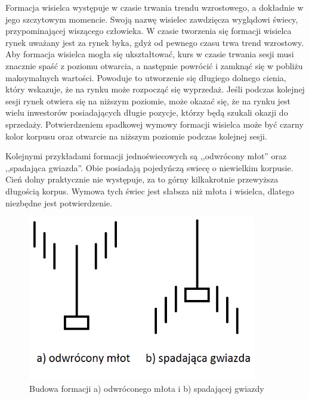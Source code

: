 \documentclass[pdflatex,11pt]{aghdpl}
\begin{document}
Formacja wisielca występuje w czasie trwania trendu wzrostowego, a dokładnie w jego szczytowym momencie. Swoją nazwę wisielec zawdzięcza wyglądowi świecy, przypominającej wiszącego człowieka. W czasie tworzenia się formacji wisielca rynek uważany jest za rynek byka, gdyż od pewnego czasu trwa trend wzrostowy. Aby formacja wisielca mogła się ukształtować, kurs w czasie trwania sesji musi znacznie spaść z poziomu otwarcia, a następnie powrócić i zamknąć się w pobliżu maksymalnych wartości. Powoduje to utworzenie się długiego dolnego cienia, który wskazuje, że na rynku może rozpocząć się wyprzedaż. Jeśli podczas kolejnej sesji rynek otwiera się na niższym poziomie, może okazać się, że na rynku jest wielu inwestorów posiadających długie pozycje, którzy będą szukali okazji do sprzedaży. Potwierdzeniem spadkowej wymowy formacji wisielca może być czarny kolor korpusu oraz otwarcie na niższym poziomie podczas kolejnej sesji.

Kolejnymi przykładami formacji jednoświecowych są ,,odwrócony młot'' oraz ,,spadająca gwiazda''. Obie posiadają pojedyńczą swiecę o niewielkim korpusie. Cień dolny praktycznie nie występuje, za to górny kilkakrotnie przewyższa długością korpus. Wymowa tych świec jest słabsza niż młota i wisielca, dlatego niezbędne jest potwierdzenie.  
\begin{figure}[ht]
\begin{center}
\includegraphics[width=10cm]{invert_hammer.png}
\caption{Budowa formacji a) odwróconego młota i b) spadającej gwiazdy}
\label{odwr_mlot}
\end{center}
\end{figure} 
\end{document}
